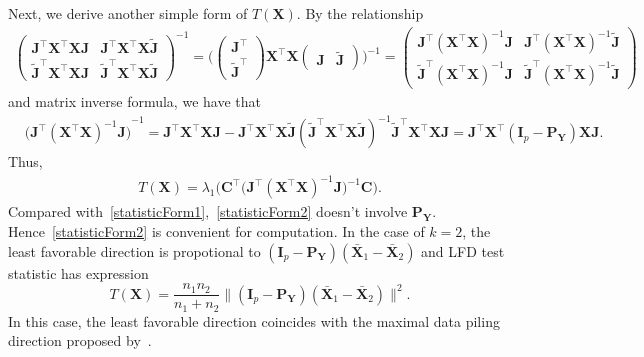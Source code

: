 \documentclass[12pt]{article} %
\newcommand{\bA}{\mathbf{A}}
\newcommand{\bX}{\mathbf{X}}
\newcommand{\bP}{\mathbf{P}}
\newcommand{\bY}{\mathbf{Y}}
\newcommand{\bJ}{\mathbf{J}}
\newcommand{\bC}{\mathbf{C}}
\newcommand{\bI}{\mathbf{I}}
\theoremstyle{definition}
\begin{document}
Next, we derive another simple form of $T(\bX)$.
By the relationship
\begin{equation*}
    \begin{aligned}
        \begin{pmatrix}
            \bJ^\top \bX^\top \bX\bJ & \bJ^\top \bX^\top \bX\tilde{\bJ}\\
            \tilde{\bJ}^\top \bX^\top \bX \bJ & \tilde{\bJ}^\top \bX^\top \bX \tilde{\bJ}
        \end{pmatrix}^{-1}
        =
        \Big(
        \begin{pmatrix}
            \bJ^\top\\
            \tilde{\bJ}^\top
        \end{pmatrix}
        \bX^\top \bX
        \begin{pmatrix}
            \bJ &\tilde{\bJ}
        \end{pmatrix}
        \Big)^{-1}
        =
        \begin{pmatrix}
            \bJ^\top {(\bX^\top \bX)}^{-1}\bJ & \bJ^\top {(\bX^\top \bX)}^{-1}\tilde{\bJ}\\
            \tilde{\bJ}^\top {(\bX^\top \bX)}^{-1}\bJ & \tilde{\bJ}^\top {(\bX^\top \bX)}^{-1} \tilde{\bJ}
        \end{pmatrix}
    \end{aligned}
\end{equation*}
and matrix inverse formula, we have that
\begin{equation*}
    \begin{aligned}
        &{\big( \bJ^\top {(\bX^\top \bX)}^{-1}\bJ \big)}^{-1}
        =\bJ^\top \bX^\top \bX \bJ - \bJ^\top \bX^\top \bX\tilde{\bJ}{(\tilde{\bJ}^\top \bX^\top \bX \tilde{\bJ})}^{-1}
            \tilde{\bJ}^\top \bX^\top \bX\bJ 
        = \bJ^\top \bX^\top( \bI_p- \bP_{\bY}) \bX \bJ.
    \end{aligned}
\end{equation*}
Thus, 
\begin{equation}\label{statisticForm2}
    \begin{aligned}
        T(\bX)=
        \lambda_1 \Big(\bC^\top\big( \bJ^\top (\bX^\top \bX)^{-1}\bJ \big)^{-1}\bC\Big).
    \end{aligned}
\end{equation}
Compared with~\eqref{statisticForm1},~\eqref{statisticForm2} doesn't involve $\bP_{\bY}$.
Hence~\eqref{statisticForm2} is convenient for computation.
In the case of $k=2$, the least favorable direction is propotional to
$
(\bI_p-\bP_{\bY}) (\bar{\bX}_1-\bar{\bX}_2)
$ and LFD test statistic has expression
$$
T(\bX)=\frac{n_1 n_2}{n_1+n_2}\| (\bI_p-\bP_{\bY}) (\bar{\bX}_1-\bar{\bX}_2)\|^2.
$$
In this case, 
the least favorable direction coincides with the maximal data piling direction proposed by~\cite{Ahn2010}.
\end{document}

